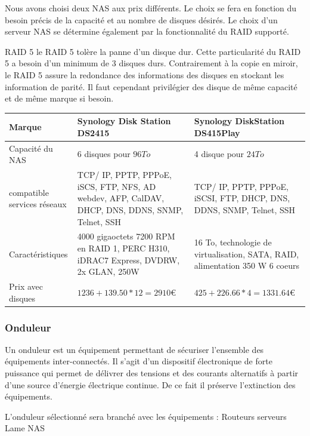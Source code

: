 Nous avons choisi deux NAS aux prix différents. Le choix se fera en fonction du besoin précis de la capacité et au nombre de disques désirés.
Le choix d'un serveur NAS se détermine également par la fonctionnalité du RAID supporté.

RAID 5
le RAID 5 tolère la panne d'un disque dur. Cette particularité du RAID 5 a besoin d'un minimum de 3 disques durs. Contrairement à la copie en miroir, le RAID 5 assure la redondance des informations des disques en stockant les information de parité. Il faut cependant privilégier des disque de même capacité et de même marque si besoin.


    \begin{center}
        \begin{tabular}{|l|p{5cm}|p{5cm}|}
          \hline
            Marque  &
Synology Disk Station DS2415
    &   Synology DiskStation DS415Play
 \\
          \hline
Capacité du NAS
  &
6 disques pour $96To$
    &
4 disque pour $24To$
 \\
          \hline
compatible services réseaux
  &
TCP/ IP, PPTP, PPPoE, iSCS, FTP, NFS, AD webdev, AFP, CalDAV, DHCP, DNS, DDNS, SNMP, Telnet, SSH
    &
TCP/ IP, PPTP, PPPoE, iSCSI, FTP, DHCP, DNS, DDNS, SNMP, Telnet, SSH
 \\
          \hline
            Caractéristiques  &
4000 gigaoctets 7200 RPM en RAID 1, PERC H310, iDRAC7 Express, DVDRW, 2x GLAN, 250W
                & 16 To, technologie de virtualisation, SATA, RAID, alimentation 350 W
6 coeurs
                  \\
        \hline
            Prix avec disques &
$1236 + 139.50 * 12 = 2910  \euro   $
    &
$425 + 226.66 * 4 = 1331.64  \euro   $
 \\
          \hline
        \end{tabular}
    \end{center}


\subsubsection{Onduleur}

Un onduleur est un équipement permettant de sécuriser l'ensemble des équipements inter-connectés. Il s'agit d'un dispositif électronique de forte puissance qui permet de délivrer des tensions et des courants alternatifs à partir d'une source d'énergie électrique continue. De ce fait il préserve l'extinction des équipements.

L'onduleur sélectionné sera branché avec les équipements :
Routeurs
serveurs Lame
NAS

